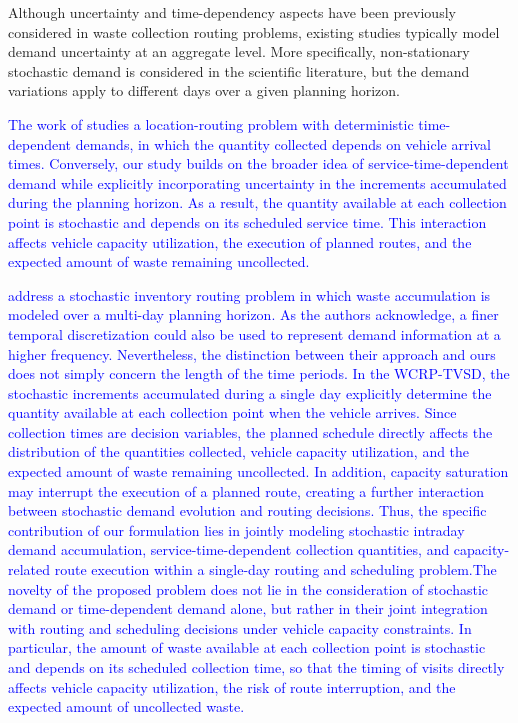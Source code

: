 \documentclass[authoryear,preprint,12pt]{elsarticle}
\newcommand{\rev}[1]{\textcolor{blue}{{#1}}}
\begin{document}
Although uncertainty and time-dependency aspects have been previously considered in waste collection routing problems, existing studies typically model demand uncertainty at an aggregate level. More specifically, non-stationary stochastic demand is considered in the scientific literature, but the demand variations apply to different days over a given planning horizon. 

\rev{The work of \cite{Yu2021} studies a location-routing problem with deterministic time-dependent demands, in which the quantity collected depends on vehicle arrival times. Conversely, our study builds on the broader idea of service-time-dependent demand while explicitly incorporating uncertainty in the increments accumulated during the planning horizon. As a result, the quantity available at each collection point is stochastic and depends on its scheduled service time. This interaction affects vehicle capacity utilization, the execution of planned routes, and the expected amount of waste remaining uncollected.}


\rev{\cite{Markov2020} address a stochastic inventory routing problem in which waste accumulation is modeled over a multi-day planning horizon. As the authors acknowledge, a finer temporal discretization could also be used to represent demand information at a higher frequency. Nevertheless, the distinction between their approach and ours does not simply concern the length of the time periods. In the WCRP-TVSD, the stochastic increments accumulated during a single day explicitly determine the quantity available at each collection point when the vehicle arrives. Since collection times are decision variables, the planned schedule directly affects the distribution of the quantities collected, vehicle capacity utilization, and the expected amount of waste remaining uncollected. In addition, capacity saturation may interrupt the execution of a planned route, creating a further interaction between stochastic demand evolution and routing decisions. Thus, the specific contribution of our formulation lies in jointly modeling stochastic intraday demand accumulation, service-time-dependent collection quantities, and capacity-related route execution within a single-day routing and scheduling problem.}\rev{The novelty of the proposed problem does not lie in the consideration of stochastic demand or time-dependent demand alone, but rather in their joint integration with routing and scheduling decisions under vehicle capacity constraints. In particular, the amount of waste available at each collection point is stochastic and depends on its scheduled collection time, so that the timing of visits directly affects vehicle capacity utilization, the risk of route interruption, and the expected amount of uncollected waste.}
\end{document}
